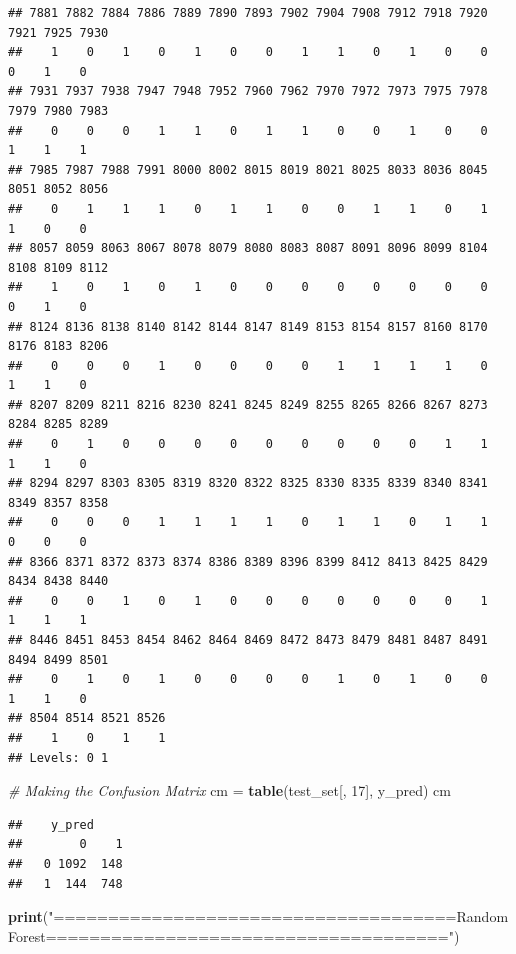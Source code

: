 \documentclass[
]{article}
\newenvironment{Shaded}{\begin{snugshade}}{\end{snugshade}}
\newcommand{\CommentTok}[1]{\textcolor[rgb]{0.56,0.35,0.01}{\textit{#1}}}
\newcommand{\DecValTok}[1]{\textcolor[rgb]{0.00,0.00,0.81}{#1}}
\newcommand{\KeywordTok}[1]{\textcolor[rgb]{0.13,0.29,0.53}{\textbf{#1}}}
\newcommand{\NormalTok}[1]{#1}
\newcommand{\StringTok}[1]{\textcolor[rgb]{0.31,0.60,0.02}{#1}}
\begin{document}
\begin{verbatim}
## 7881 7882 7884 7886 7889 7890 7893 7902 7904 7908 7912 7918 7920 7921 7925 7930 
##    1    0    1    0    1    0    0    1    1    0    1    0    0    0    1    0 
## 7931 7937 7938 7947 7948 7952 7960 7962 7970 7972 7973 7975 7978 7979 7980 7983 
##    0    0    0    1    1    0    1    1    0    0    1    0    0    1    1    1 
## 7985 7987 7988 7991 8000 8002 8015 8019 8021 8025 8033 8036 8045 8051 8052 8056 
##    0    1    1    1    0    1    1    0    0    1    1    0    1    1    0    0 
## 8057 8059 8063 8067 8078 8079 8080 8083 8087 8091 8096 8099 8104 8108 8109 8112 
##    1    0    1    0    1    0    0    0    0    0    0    0    0    0    1    0 
## 8124 8136 8138 8140 8142 8144 8147 8149 8153 8154 8157 8160 8170 8176 8183 8206 
##    0    0    0    1    0    0    0    0    1    1    1    1    0    1    1    0 
## 8207 8209 8211 8216 8230 8241 8245 8249 8255 8265 8266 8267 8273 8284 8285 8289 
##    0    1    0    0    0    0    0    0    0    0    0    1    1    1    1    0 
## 8294 8297 8303 8305 8319 8320 8322 8325 8330 8335 8339 8340 8341 8349 8357 8358 
##    0    0    0    1    1    1    1    0    1    1    0    1    1    0    0    0 
## 8366 8371 8372 8373 8374 8386 8389 8396 8399 8412 8413 8425 8429 8434 8438 8440 
##    0    0    1    0    1    0    0    0    0    0    0    0    1    1    1    1 
## 8446 8451 8453 8454 8462 8464 8469 8472 8473 8479 8481 8487 8491 8494 8499 8501 
##    0    1    0    1    0    0    0    0    1    0    1    0    0    1    1    0 
## 8504 8514 8521 8526 
##    1    0    1    1 
## Levels: 0 1
\end{verbatim}

\begin{Shaded}
\begin{Highlighting}[]
\CommentTok{# Making the Confusion Matrix}
\NormalTok{cm =}\StringTok{ }\KeywordTok{table}\NormalTok{(test_set[, }\DecValTok{17}\NormalTok{], y_pred)}
\NormalTok{cm}
\end{Highlighting}
\end{Shaded}

\begin{verbatim}
##    y_pred
##        0    1
##   0 1092  148
##   1  144  748
\end{verbatim}

\begin{Shaded}
\begin{Highlighting}[]
\KeywordTok{print}\NormalTok{(}\StringTok{"=====================================Random Forest====================================="}\NormalTok{)}
\end{Highlighting}
\end{Shaded}
\end{document}
